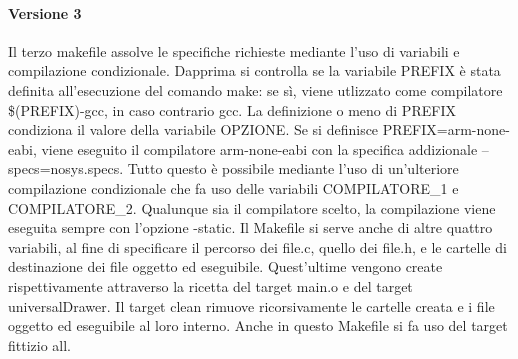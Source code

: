 \documentclass{article}
\begin{document}
		\paragraph*{Versione 3}
                Il terzo makefile assolve le specifiche richieste mediante l'uso di variabili e compilazione condizionale. Dapprima si controlla se la variabile PREFIX è stata definita all'esecuzione del comando make:
                se sì, viene utlizzato come compilatore \$(PREFIX)-gcc, in caso contrario gcc. La definizione o meno di PREFIX condiziona il valore della variabile OPZIONE.
                Se si definisce PREFIX=arm-none-eabi, viene eseguito il compilatore arm-none-eabi con la specifica addizionale --specs=nosys.specs. Tutto questo è possibile mediante l'uso di un'ulteriore
                compilazione condizionale che fa uso delle variabili COMPILATORE\_1 e COMPILATORE\_2.
                Qualunque sia il compilatore scelto, la compilazione viene eseguita sempre con l'opzione -static.
                Il Makefile si serve anche di altre quattro variabili, al fine di specificare il percorso dei file.c, quello dei file.h, e le cartelle di destinazione dei file oggetto ed eseguibile.
                Quest'ultime vengono create rispettivamente attraverso la ricetta del target main.o e del target universalDrawer.
                Il target clean rimuove ricorsivamente le cartelle creata e i file oggetto ed eseguibile al loro interno.
                Anche in questo Makefile si fa uso del target fittizio all.
\end{document}

